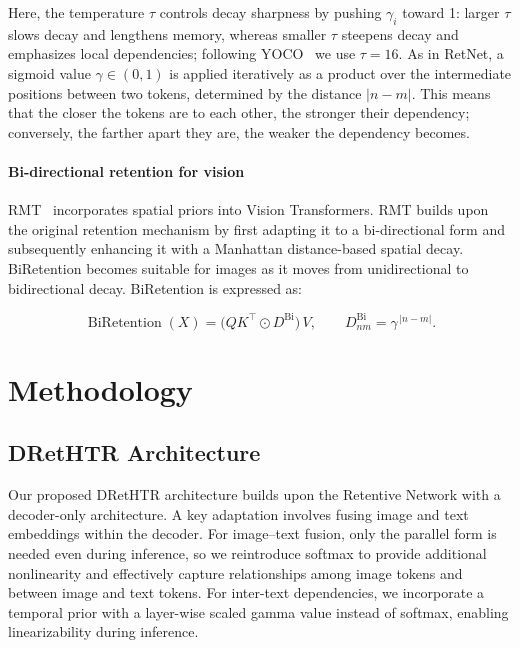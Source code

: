 \documentclass[times, review, 10pt]{elsarticle}
\begin{document}
Here, the temperature \(\tau\) controls decay sharpness by pushing \(\gamma_i\) toward 1: larger \(\tau\) slows decay and lengthens memory, whereas smaller \(\tau\) steepens decay and emphasizes local dependencies; following YOCO~\cite{yoco} we use \(\tau=16\). As in RetNet, a sigmoid value \(\gamma\in(0,1)\) is applied iteratively as a product over the intermediate positions between two tokens, determined by the distance \(|n-m|\). 
This means that the closer the tokens are to each other, the stronger their dependency; conversely, the farther apart they are, the weaker the dependency becomes.

\paragraph{Bi-directional retention for vision}
RMT~\cite{rmt} incorporates spatial priors into Vision Transformers. RMT builds upon the original retention mechanism by first adapting it to a bi-directional form and subsequently enhancing it with a Manhattan distance-based spatial decay. BiRetention becomes suitable for images as it moves from unidirectional to bidirectional decay. BiRetention is expressed as:

\begin{equation}
\operatorname{BiRetention}(X)=\big(QK^{\top}\odot D^{\mathrm{Bi}}\big)\,V,\qquad
D^{\mathrm{Bi}}_{nm}=\gamma^{\,|n-m|}.
\label{eq:biretention-one}
\end{equation}


\section{Methodology}
\label{sec:method}

\subsection{DRetHTR Architecture}
\label{sec:architecture}
Our proposed DRetHTR architecture builds upon the Retentive Network with a decoder-only architecture. A key adaptation involves fusing image and text embeddings within the decoder. For image–text fusion, only the parallel form is needed even during inference, so we reintroduce softmax to provide additional nonlinearity and effectively capture relationships among image tokens and between image and text tokens. For inter-text dependencies, we incorporate a temporal prior with a layer-wise scaled gamma value instead of softmax, enabling linearizability during inference.
\end{document}
